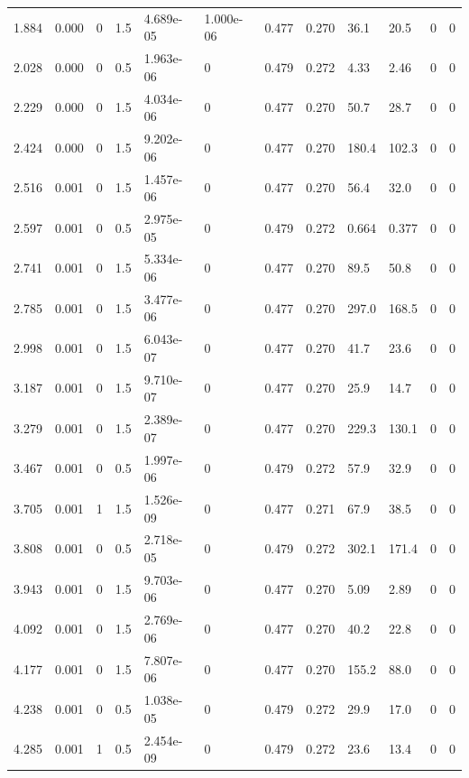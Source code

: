 \documentclass[preview]{standalone}
\begin{document}
{{\begin{tabular}{L{1.2cm}C{1.2cm} C{0.3cm}C{0.5cm} C{1.4cm}C{1.4cm} C{1.4cm}C{1.4cm} C{1.6cm}C{1.6cm} C{1.6cm}C{1.6cm}}
  1.884  &  0.000  & 0     & 1.5 &  4.689e-05  & 1.000e-06  &  0.477&   0.270& 36.1 & 20.5   &  0 & 0  \\ 
  2.028  &  0.000  & 0     & 0.5 &  1.963e-06  & 0  &  0.479&   0.272& 4.33 & 2.46   &  0 & 0  \\ 
  2.229  &  0.000  & 0     & 1.5 &  4.034e-06  & 0  &  0.477&   0.270& 50.7 & 28.7   &  0 & 0  \\ 
  2.424  &  0.000  & 0     & 1.5 &  9.202e-06  & 0  &  0.477&   0.270& 180.4 & 102.3   &  0 & 0  \\ 
  2.516  &  0.001  & 0     & 1.5 &  1.457e-06  & 0  &  0.477&   0.270& 56.4 & 32.0   &  0 & 0  \\ 
  2.597  &  0.001  & 0     & 0.5 &  2.975e-05  & 0  &  0.479&   0.272& 0.664 & 0.377   &  0 & 0  \\ 
  2.741  &  0.001  & 0     & 1.5 &  5.334e-06  & 0  &  0.477&   0.270& 89.5 & 50.8   &  0 & 0  \\ 
  2.785  &  0.001  & 0     & 1.5 &  3.477e-06  & 0  &  0.477&   0.270& 297.0 & 168.5   &  0 & 0  \\ 
  2.998  &  0.001  & 0     & 1.5 &  6.043e-07  & 0  &  0.477&   0.270& 41.7 & 23.6   &  0 & 0  \\ 
  3.187  &  0.001  & 0     & 1.5 &  9.710e-07  & 0  &  0.477&   0.270& 25.9 & 14.7   &  0 & 0  \\ 
  3.279  &  0.001  & 0     & 1.5 &  2.389e-07  & 0  &  0.477&   0.270& 229.3 & 130.1   &  0 & 0  \\ 
  3.467  &  0.001  & 0     & 0.5 &  1.997e-06  & 0  &  0.479&   0.272& 57.9 & 32.9   &  0 & 0  \\ 
  3.705  &  0.001  & 1     & 1.5 &  1.526e-09  & 0  &  0.477&   0.271& 67.9 & 38.5   &  0 & 0  \\ 
  3.808  &  0.001  & 0     & 0.5 &  2.718e-05  & 0  &  0.479&   0.272& 302.1 & 171.4   &  0 & 0  \\ 
  3.943  &  0.001  & 0     & 1.5 &  9.703e-06  & 0  &  0.477&   0.270& 5.09 & 2.89   &  0 & 0  \\ 
  4.092  &  0.001  & 0     & 1.5 &  2.769e-06  & 0  &  0.477&   0.270& 40.2 & 22.8   &  0 & 0  \\ 
  4.177  &  0.001  & 0     & 1.5 &  7.807e-06  & 0  &  0.477&   0.270& 155.2 & 88.0   &  0 & 0  \\ 
  4.238  &  0.001  & 0     & 0.5 &  1.038e-05  & 0  &  0.479&   0.272& 29.9 & 17.0   &  0 & 0  \\ 
  4.285  &  0.001  & 1     & 0.5 &  2.454e-09  & 0  &  0.479&   0.272& 23.6 & 13.4   &  0 & 0  \\ 

\end{tabular}}}
\end{document}
